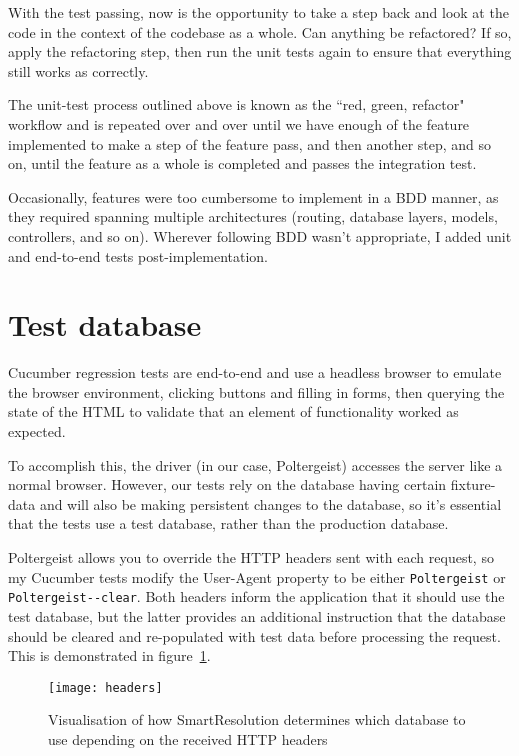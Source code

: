 With the test passing, now is the opportunity to take a step back and look at the code in the context of the codebase as a whole. Can anything be refactored? If so, apply the refactoring step, then run the unit tests again to ensure that everything still works as correctly.

The unit-test process outlined above is known as the ``red, green, refactor" workflow and is repeated over and over until we have enough of the feature implemented to make a step of the feature pass, and then another step, and so on, until the feature as a whole is completed and passes the integration test.

Occasionally, features were too cumbersome to implement in a BDD manner, as they required spanning multiple architectures (routing, database layers, models, controllers, and so on). Wherever following BDD wasn't appropriate, I added unit and end-to-end tests post-implementation.

\section{Test database}

Cucumber regression tests are end-to-end and use a headless browser to emulate the browser environment, clicking buttons and filling in forms, then querying the state of the HTML to validate that an element of functionality worked as expected.

To accomplish this, the driver (in our case, Poltergeist) accesses the server like a normal browser. However, our tests rely on the database having certain fixture-data and will also be making persistent changes to the database, so it's essential that the tests use a test database, rather than the production database.

Poltergeist allows you to override the HTTP headers sent with each request, so my Cucumber tests modify the User-Agent property to be either \lstinline{Poltergeist} or \lstinline{Poltergeist--clear}. Both headers inform the application that it should use the test database, but the latter provides an additional instruction that the database should be cleared and re-populated with test data before processing the request. This is demonstrated in figure~\ref{uml:headers}.

\begin{figure}[h!]
  \centering
    \ifimages
    \texttt{[image: headers]}
    \fi
  \caption{Visualisation of how SmartResolution determines which database to use depending on the received HTTP headers}
  \label{uml:headers}
\end{figure}

